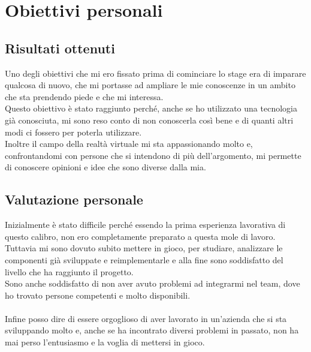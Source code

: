   \section{Obiettivi personali}
    \subsection{Risultati ottenuti}
      Uno degli obiettivi che mi ero fissato prima di cominciare lo stage era di imparare qualcosa di nuovo, che mi portasse ad ampliare le mie conoscenze in un ambito che sta prendendo piede e che mi interessa.\\
      Questo obiettivo è stato raggiunto perché, anche se ho utilizzato una tecnologia già conosciuta, mi sono reso conto di non conoscerla così bene e di quanti altri modi ci fossero per poterla utilizzare.\\
      Inoltre il campo della realtà virtuale mi sta appassionando molto e, confrontandomi con persone che si intendono di più dell'argomento, mi permette di conoscere opinioni e idee che sono diverse dalla mia.
    \subsection{Valutazione personale}
      Inizialmente è stato difficile perché essendo la prima esperienza lavorativa di questo calibro, non ero completamente preparato a questa mole di lavoro.\\
      Tuttavia mi sono dovuto subito mettere in gioco, per studiare, analizzare le componenti già sviluppate e reimplementarle e alla fine sono soddisfatto del livello che ha raggiunto il progetto.\\
      Sono anche soddisfatto di non aver avuto problemi ad integrarmi nel team, dove ho trovato persone competenti e molto disponibili.\\\\
      Infine posso dire di essere orgoglioso di aver lavorato in un'azienda che si sta sviluppando molto e, anche se ha incontrato diversi problemi in passato, non ha mai perso l'entusiasmo e la voglia di mettersi in gioco.
\vfill
\newpage
\null
\thispagestyle{empty}
